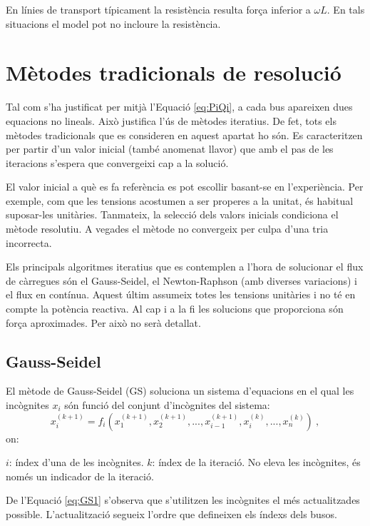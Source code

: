 En línies de transport típicament la resistència resulta força inferior a $\omega L$. En tals situacions el model pot no incloure la resistència. 


\section{Mètodes tradicionals de resolució}
Tal com s'ha justificat per mitjà l'Equació \ref{eq:PiQi}, a cada bus apareixen dues equacions no lineals. Això justifica l'ús de mètodes iteratius. De fet, tots els mètodes tradicionals que es consideren en aquest apartat ho són. Es caracteritzen per partir d'un valor inicial (també anomenat llavor) que amb el pas de les iteracions s'espera que convergeixi cap a la solució.

El valor inicial a què es fa referència es pot escollir basant-se en l'experiència. Per exemple, com que les tensions acostumen a ser properes a la unitat, és habitual suposar-les unitàries. Tanmateix, la selecció dels valors inicials condiciona el mètode resolutiu. A vegades el mètode no convergeix per culpa d'una tria incorrecta. 

Els principals algoritmes iteratius que es contemplen a l'hora de solucionar el flux de càrregues són el Gauss-Seidel, el Newton-Raphson (amb diverses variacions) i el flux en contínua. Aquest últim assumeix totes les tensions unitàries i no té en compte la potència reactiva. Al cap i a la fi les solucions que proporciona són força aproximades. Per això no serà detallat. 

\subsection{Gauss-Seidel}

El mètode de Gauss-Seidel (GS) soluciona un sistema d'equacions en el qual les incògnites $x_i$ són funció del conjunt d'incògnites del sistema:
\begin{equation}
    x_i^{(k+1)}=f_i(x^{(k+1)}_1, x^{(k+1)}_2, ... , x^{(k+1)}_{i-1}, x^{(k)}_i, ... , x^{(k)}_n)\ ,
    \label{eq:GS1}
\end{equation}
on:

$i$: índex d'una de les incògnites.
\vs
$k$: índex de la iteració. No eleva les incògnites, és només un indicador de la iteració.

De l'Equació \ref{eq:GS1} s'observa que s'utilitzen les incògnites el més actualitzades possible. L'actualització segueix l'ordre que defineixen els índexs dels busos. 


